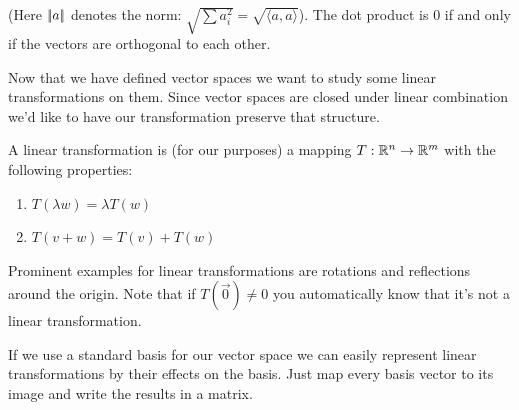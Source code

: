\bigskip
(Here $|\!|a|\!|$ denotes the norm: $\sqrt{\sum a_i^2} = \sqrt{\langle a,a\rangle }$). The dot product is $0$ if and only if the vectors are orthogonal to each other.

Now that we have defined vector spaces we want to study some linear transformations on them. Since vector spaces are closed under linear combination we'd like to have our transformation preserve that structure.

\begin{Def} A linear transformation is (for our purposes) a mapping $T : \mathbb{R}^n \rightarrow \mathbb{R}^m$ with the following properties:

\begin{enumerate}
\item $T(\lambda w) = \lambda T(w)$
\item $T(v+w) = T(v)+T(w)$
\end{enumerate}
\end{Def}

Prominent examples for linear transformations are rotations and reflections around the origin. Note that if $T(\vec 0)\neq 0$ you automatically know that it's not a linear transformation.

If we use a standard basis for our vector space we can easily represent linear transformations by their effects on the basis. Just map every basis vector to its image and write the results in a matrix. 

